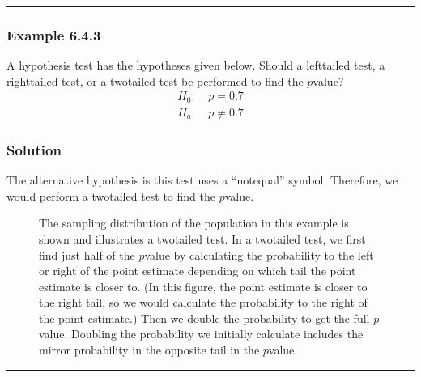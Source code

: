 \documentclass[letterpaper,10pt,english]{jupyterBook}
\begin{document}
\bigskip\hrule\bigskip



\subsubsection{Example 6.4.3}
\label{\detokenize{Ch6 An Introduction to Hypothesis Testing/6.4 Hypothesis Tests of One Population:example-6-4-3}}
\sphinxAtStartPar
A hypothesis test has the hypotheses given below. Should a left\sphinxhyphen{}tailed test, a right\sphinxhyphen{}tailed test, or a two\sphinxhyphen{}tailed test be performed to find the \(p\)\sphinxhyphen{}value?
\begin{align*}
H_0:&\ p = 0.7 \\
H_a:&\ p \neq 0.7
\end{align*}

\subsubsection{Solution}
\label{\detokenize{Ch6 An Introduction to Hypothesis Testing/6.4 Hypothesis Tests of One Population:id2}}
\sphinxAtStartPar
The alternative hypothesis is this test uses a “not\sphinxhyphen{}equal” symbol. Therefore, we would perform a two\sphinxhyphen{}tailed test to find the \(p\)\sphinxhyphen{}value.

\begin{figure}[htbp]
\centering
\capstart

\noindent{}
\caption{The sampling distribution of the population in this example is shown and illustrates a two\sphinxhyphen{}tailed test. In a two\sphinxhyphen{}tailed test, we first find just half of the \(p\)\sphinxhyphen{}value by calculating the probability to the left or right of the point estimate depending on which tail the point estimate is closer to. (In this figure, the point estimate is closer to the right tail, so we would calculate the probability to the right of the point estimate.) Then we double the probability to get the full \(p\)\sphinxhyphen{}value. Doubling the probability we initially calculate includes the mirror probability in the opposite tail in the \(p\)\sphinxhyphen{}value.}\label{\detokenize{Ch6 An Introduction to Hypothesis Testing/6.4 Hypothesis Tests of One Population:two-tailed}}\end{figure}


\bigskip\hrule\bigskip
\end{document}
